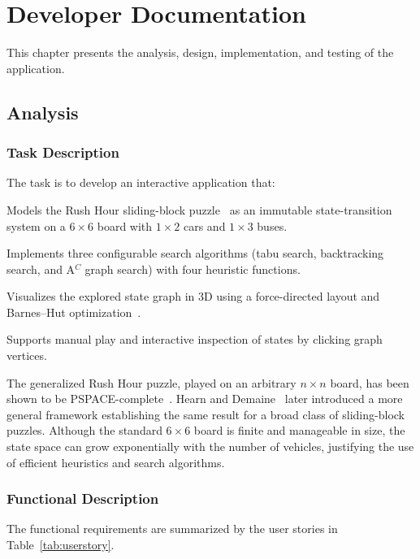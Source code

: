 \chapter{Developer Documentation}
\label{ch:impl}

This chapter presents the analysis, design, implementation, and testing of the application.

\section{Analysis}

\subsection{Task Description}

The task is to develop an interactive application that:
\begin{compactenum}
\item Models the Rush Hour sliding-block puzzle~\cite{rushhour_puzzle} as an immutable state-transition system on a $6\times6$ board with $1\times2$ cars and $1\times3$ buses.
\item Implements three configurable search algorithms (tabu search, backtracking search, and A$^C$ graph search) with four heuristic functions.
\item Visualizes the explored state graph in 3D using a force-directed layout and Barnes--Hut optimization~\cite{barneshut1986}.
\item Supports manual play and interactive inspection of states by clicking graph vertices.
\end{compactenum}

The generalized Rush Hour puzzle, played on an arbitrary $n \times n$ board, has been shown to be PSPACE-complete~\cite{flake2002rush}. Hearn and Demaine~\cite{hearn2005pspace} later introduced a more general framework establishing the same result for a broad class of sliding-block puzzles. Although the standard $6 \times 6$ board is finite and manageable in size, the state space can grow exponentially with the number of vehicles, justifying the use of efficient heuristics and search algorithms.

\subsection{Functional Description}

The functional requirements are summarized by the user stories in Table~\ref{tab:userstory}.

